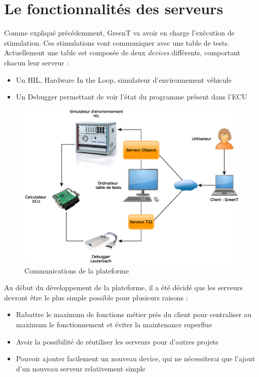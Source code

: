 \section{Le fonctionnalités des serveurs}
Comme expliqué précédemment, GreenT va avoir en charge l'exécution de stimulation. Ces stimulations vont communiquer avec une table de
tests. Actuellement une table est composée de deux \textit{devices} différents, comportant chacun leur serveur : 
\begin{itemize}
	\item Un HIL, Hardware In the Loop, simulateur d'environnement véhicule
	\item Un Debugger permettant de voir l'état du programme présent dans l'ECU
\end{itemize}

\begin{figure}[H]
	\centering
	\includegraphics[width=16cm]{contents/images/network.eps}
	\caption{Communications de la plateforme}
\end{figure}

Au début du développement de la plateforme, il a été décidé que les serveurs devront être le plus simple possible pour plusieurs raisons
: 
\begin{itemize}
	\item Rabattre le maximum de fonctions métier près du client pour centraliser au maximum le fonctionnement et éviter la maintenance superflue
	\item Avoir la possibilité de réutiliser les serveurs pour d'autres projets
	\item Pouvoir ajouter facilement un nouveau device, qui ne nécessiterai que l'ajout d'un nouveau serveur relativement simple
\end{itemize}

